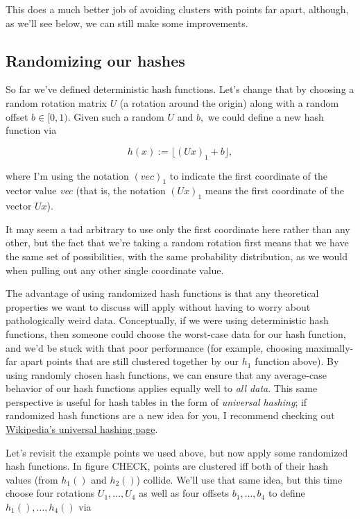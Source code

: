 \documentclass[20pt,]{extarticle}
\begin{document}
This does a much better job of avoiding clusters with points far apart,
although, as we'll see below, we can still make some improvements.

\subsection{Randomizing our hashes}\label{randomizing-our-hashes}

So far we've defined deterministic hash functions. Let's change that by
choosing a random rotation matrix \(U\) (a rotation around the origin)
along with a random offset \(b \in [0, 1).\) Given such a random \(U\)
and \(b,\) we could define a new hash function via

\[ h(x) := \lfloor (Ux)_1 + b \rfloor, \]

where I'm using the notation \(( \textit{vec} )_1\) to indicate the
first coordinate of the vector value \emph{vec} (that is, the notation
\((Ux)_1\) means the first coordinate of the vector \(Ux\)).

It may seem a tad arbitrary to use only the first coordinate here rather
than any other, but the fact that we're taking a random rotation first
means that we have the same set of possibilities, with the same
probability distribution, as we would when pulling out any other single
coordinate value.

The advantage of using randomized hash functions is that any theoretical
properties we want to discuss will apply without having to worry about
pathologically weird data. Conceptually, if we were using deterministic
hash functions, then someone could choose the worst-case data for our
hash function, and we'd be stuck with that poor performance (for
example, choosing maximally-far apart points that are still clustered
together by our \(h_1\) function above). By using randomly chosen hash
functions, we can ensure that any average-case behavior of our hash
functions applies equally well to \emph{all data}. This same perspective
is useful for hash tables in the form of \emph{universal hashing}; if
randomized hash functions are a new idea for you, I recommend checking
out \href{https://en.wikipedia.org/wiki/Universal_hashing}{Wikipedia's
universal hashing page}.

Let's revisit the example points we used above, but now apply some
randomized hash functions. In figure CHECK, points are clustered iff
both of their hash values (from \(h_1()\) and \(h_2()\)) collide. We'll
use that same idea, but this time choose four rotations
\(U_1, \ldots, U_4\) as well as four offsets \(b_1, \ldots, b_4\) to
define \(h_1(), \ldots, h_4()\) via
\end{document}
